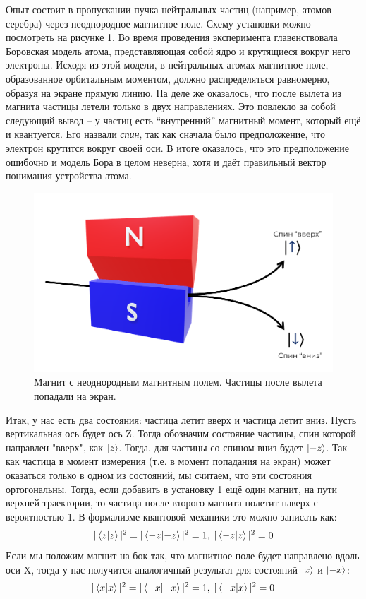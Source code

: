 Опыт состоит в пропускании пучка нейтральных частиц (например, атомов серебра) через неоднородное магнитное поле. Схему установки можно посмотреть на рисунке \ref{fig B.1}. Во время проведения эксперимента главенствовала Боровская модель атома, представляющая собой ядро и крутящиеся вокруг него электроны. Исходя из этой модели, в нейтральных атомах магнитное поле, образованное орбитальным моментом, должно распределяться равномерно, образуя на экране прямую линию. На деле же оказалось, что после вылета из магнита частицы летели только в двух направлениях. Это повлекло за собой следующий вывод -- у частиц есть ``внутренний'' магнитный момент, который ещё и квантуется. Его назвали \textit{спин}, так как сначала было предположение, что электрон крутится вокруг своей оси. В итоге оказалось, что это предположение ошибочно и модель Бора в целом неверна, хотя и даёт правильный вектор понимания устройства атома.
\begin{figure}[!ht]
\centering
\includegraphics[scale=0.4]{appendix/images/gc.png}
\caption{Магнит с неоднородным магнитным полем. Частицы после вылета попадали на экран.}
\label{fig B.1}
\end{figure}

Итак, у нас есть два состояния: частица летит вверх и частица летит вниз. Пусть вертикальная ось будет ось Z. Тогда обозначим состояние частицы, спин которой направлен "вверх", как $\ket{z}$. Тогда, для частицы со спином вниз будет $\ket{-z}$. Так как частица в момент измерения (т.е. в момент попадания на экран) может оказаться только в одном из состояний, мы считаем, что эти состояния ортогональны. Тогда, если добавить в установку \ref{fig B.1} ещё один магнит, на пути верхней траектории, то частица после второго магнита полетит наверх с вероятностью 1. В формализме квантовой механики это можно записать как:
\[
|\bra{z}\ket{z}|^2 = |\bra{-z}\ket{-z}|^2 = 1,\; |\bra{-z}\ket{z}|^2 = 0
\]
Если мы положим магнит на бок так, что магнитное поле будет направлено вдоль оси X, тогда у нас получится аналогичный результат для состояний $\ket{x}$ и $\ket{-x}$:
\[
|\bra{x}\ket{x}|^2 = |\bra{-x}\ket{-x}|^2 = 1,\;|\bra{-x}\ket{x}|^2 = 0
\]


